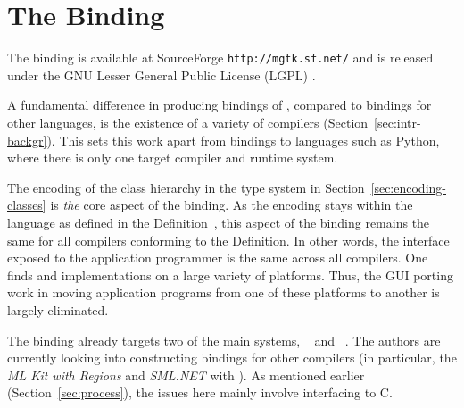\documentclass[finalversion]{usetex-v1}
\begin{document}





\section{The \mgtk Binding}
\label{sec:mgtk-binding}

The \mgtk binding is available at SourceForge \texttt{http://mgtk.sf.net/}
and is released under the GNU Lesser General Public License
(LGPL) \cite{LGPL:1999}.

A fundamental difference in producing \sml bindings of \gtk, compared
to bindings for other languages, is the existence of a variety of
compilers (Section~\ref{sec:intr-backgr}). This sets
this work apart from bindings to languages such as Python, where
there is only one target compiler and runtime system. 

The encoding of the \gtk class hierarchy in the \sml type system in
Section~\ref{sec:encoding-classes} is \emph{the} core aspect of the
binding. As the encoding stays within the language as defined in the
Definition~\cite{Milner:1997:Definition}, this aspect of the binding
remains the same for all \sml compilers conforming to the Definition.
In other words, the interface exposed to the application programmer is
the same across all compilers.
%
One finds \sml and \gtk implementations on a large variety of
platforms. Thus, the GUI porting work in moving application programs from one of these
platforms to another is largely eliminated.

The \mgtk binding already targets two of the main \sml systems,
\mosml~\cite{Mosml-webpage:2003} and \mlton~\cite{MLton-webpage:2003}.
The authors are currently looking into constructing
bindings for other \sml compilers (in particular, the \emph{ML Kit
  with Regions} \cite{MLKit-webpage:2003} and \emph{SML.NET}
\cite{SML.NET-webpage:2003} with \gtksharp). As mentioned earlier
(Section~\ref{sec:process}), the issues here  mainly involve interfacing
to C.
\end{document}
